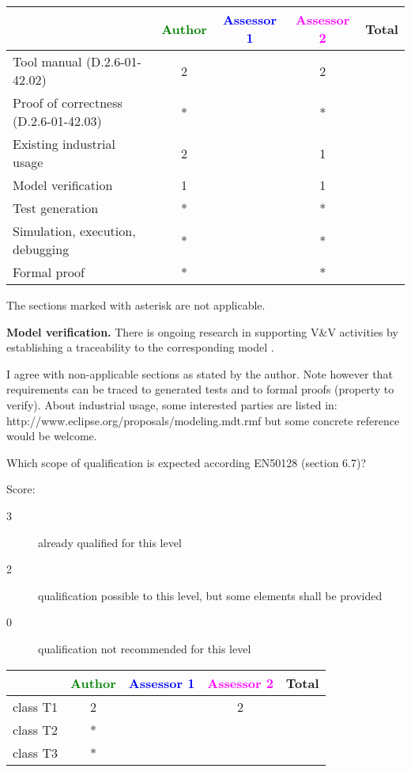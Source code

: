 \begin{tabular}{|l | c | c | c | c|}
\hline
& \textcolor{green}{Author} & \textcolor{blue}{Assessor 1} & \textcolor{magenta}{Assessor 2} & Total \\
\hline
Tool manual (D.2.6-01-42.02) & 2 & & 2 &  \\
\hline
Proof of correctness (D.2.6-01-42.03) & * & & * & \\
\hline
Existing industrial  usage  & 2 & & 1 & \\
\hline
Model verification & 1 & & 1 & \\
\hline
Test generation & * & & * & \\
\hline
Simulation, execution, debugging & * & & * & \\
\hline
Formal proof & * & & * & \\
\hline
\end{tabular}

\begin{author_comment}
The sections marked with asterisk are not applicable.

\textbf{Model verification.} There is ongoing research in supporting V\&V activities by establishing a traceability to the corresponding model \cite {HalJasLad2013}.

\end{author_comment}


\begin{assessor2}
I agree with non-applicable sections as stated by the author. Note however that requirements can be traced to generated tests and to formal proofs (property to verify). About industrial usage, some interested parties are listed in: http://www.eclipse.org/proposals/modeling.mdt.rmf but some concrete reference would be welcome.
\end{assessor2}

Which scope of qualification is expected according EN50128 (section 6.7)?

Score:
\begin{description}
\item[3] already qualified for this level
\item[2] qualification possible to this level, but some elements shall be provided
\item[0] qualification not recommended for this level
\end{description}


\begin{tabular}{|l | c | c | c | c|}
\hline
& \textcolor{green}{Author} & \textcolor{blue}{Assessor 1} & \textcolor{magenta}{Assessor 2} & Total \\
\hline
class T1 & 2 & & 2 &  \\
\hline
class T2   & * & & & \\
\hline
class T3  & * & & & \\
\hline
\end{tabular}

